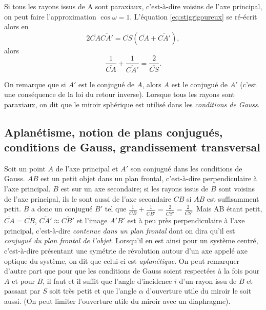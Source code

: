 Si tous les rayons issus de A sont paraxiaux, c'est-à-dire voisins de l'axe principal, on peut faire l'approximation $\cos \omega = 1$. L'équation \ref{eq:stigrigoureux} se ré-écrit alors en
\begin{equation}
  2 \overline{CA} \overline{CA'} = \overline{CS}(\overline{CA}+ \overline{CA'}),
\end{equation}
alors
\begin{equation}
  \frac{1}{\overline{CA}} + \frac{1}{\overline{CA'}} = \frac{2}{\overline{CS}}.
\end{equation}

On remarque que si $A'$ est le conjugué de $A$, alors $A$ est le conjugué de $A'$ (c'est une conséquence de la loi du retour inverse). Lorsque tous les rayons sont paraxiaux, on dit que le miroir sphérique est utilisé dans les \emph{conditions de Gauss}.

\subsection{Aplanétisme, notion de plans conjugués, conditions de Gauss, grandissement transversal}
\label{chap7-subsec:aplanetisme}

Soit un point $A$ de l'axe principal et $A'$ son conjugué dans les conditions de Gauss. $AB$ est un petit objet dans un plan frontal, c'est-à-dire perpendiculaire à l'axe principal. $B$ est sur un axe secondaire; si les rayons issus de $B$ sont voisins de l'axe principal, ils le sont aussi de l'axe secondaire $CB$ si $AB$ est suffisamment petit. $B$ a donc un conjugué $B'$ tel que $\frac{1}{\overline{CB}}+\frac{1}{\overline{CB'}} = \frac{2}{\overline{CS'}} = \frac{2}{\overline{CS}}$. Mais AB étant petit, $\overline{CA}=\overline{CB}$, $\overline{CA'} \approx \overline{CB'}$ et l'image $A'B'$ est à peu près perpendiculaire à l'axe principal, c'est-à-dire \emph{contenue dans un plan frontal} dont on dira qu'il est \emph{conjugué du plan frontal de l'objet}.
Lorsqu'il en est ainsi pour un système centré, c'est-à-dire présentant une symétrie de révolution autour d'un axe appelé axe optique du système, on dit que celui-ci est \emph{aplanétique}.
On peut remarquer d'autre part que pour que les conditions de Gauss soient respectées à la fois pour $A$ et pour $B$, il faut et il suffit que l'angle d'incidence $i$ d'un rayon issu de $B$ et passant par $S$ soit très petit et que l'angle $\alpha$ d'ouverture utile du miroir le soit aussi. (On peut limiter l'ouverture utile du miroir avec un diaphragme).

